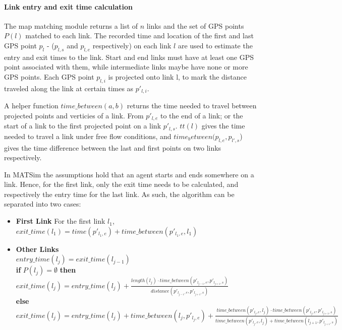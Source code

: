 \paragraph{Link entry and exit time calculation}
The map matching module returns a list of $n$ links and the set of GPS points $P(l)$ matched to each link. The recorded time and location of the first and last GPS point $p_{l}$ - ($p_{l,s}$ and $p_{l,e}$ respectively) on each link $l$ are used to estimate the entry and exit times to the link. 
Start and end links must have at least one GPS point associated with them, while intermediate links maybe have none or more GPS points. 
Each GPS point $p_{l,i}$ is projected onto link l, to mark the distance traveled along the link at certain times as $p'_{l,i}$.

A helper function $time\_between(a,b)$ returns the time needed to travel between projected points and verticies of a link. From $p'_{l,e}$ to the end of a link; or the start of a link to the first projected point on a link $p'_{l,s}$. 
$tt(l)$ gives the time needed to travel a link under free flow conditions, and $time_between(p_{l,e}, p_{l',s}$) gives the time difference between the last and first points on two links respectively.

In MATSim the assumptions hold that an agent starts and ends somewhere on a link. Hence, for the first link, only the exit time needs to be calculated, and respectively the entry time for the last link. As such, the algorithm can be separated into two cases:
\begin{itemize}
	\item \textbf{First Link} For the first link $l_1$, $exit\_time(l_1) = time(p'_{l_1,e}) + time\_between(p'_{l_1,e}, l_1)$
	\item \textbf{Other Links} \\
		$entry\_time(l_{j}) = exit\_time(l_{j-1}) $ \\
		\textbf{if} $P(l_j) = \emptyset$ \textbf{then} $exit\_time(l_j) = entry\_time(l_j) + 
										\frac{length(l_j) \cdot time\_between(p'_{l_{j-1},e}, p'_{l_{j+1},s})}{distance(p'_{l_{j-1},e}, p'_{l_{j+1},s})} $ \\
		\textbf{else}  $exit\_time(l_j) = entry\_time(l_j) + time\_between(l_{j}, p'_{l_j,e}) + \frac{time\_between(p'_{l_j,e}, l_{j}) \cdot time\_between(p'_{l_j,e}, p'_{l_{j+1},s})} 
					{time\_between(p'_{l_j,e}, l_{j}) + time\_between(l_{j+1},p'_{l_{j+1},s})}   $ \\
\end{itemize}

